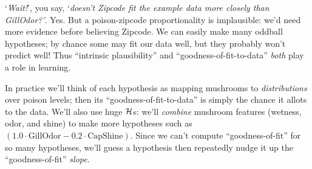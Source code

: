  `\emph{Wait!}', you say,
  `\emph{doesn't Zipcode fit the example data more closely than GillOdor?'}.
  Yes.  But a poison-zipcode proportionality is implausible: we'd need
  more evidence before believing Zipcode.  We can easily make many oddball
  hypotheses; by chance some may fit our data well, but they probably
  won't predict well!
  Thus
  ``intrinsic plausibility'' and ``goodness-of-fit-to-data''
  \emph{both} play a role in learning.

  In practice we'll think of each hypothesis as mapping mushrooms to
  \emph{distributions} over poison levels; then its
  ``goodness-of-fit-to-data'' is simply the chance it allots to the
  data.
  We'll also use huge $\mathcal{H}$s: we'll \emph{combine} mushroom features
  (wetness, odor, and shine) to make more hypotheses such as
  $
    (1.0 \cdot \text{GillOdor} - 0.2\cdot \text{CapShine})
  $.
  Since we can't compute ``goodness-of-fit'' for so many hypotheses,
  we'll guess a hypothesis
  then repeatedly
  nudge it up the ``goodness-of-fit'' \emph{slope}.



